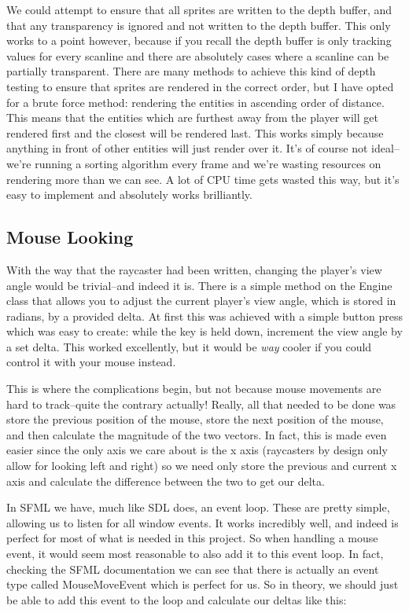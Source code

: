 \documentclass{article}
\begin{document}
We could attempt to ensure that all sprites are written to the depth buffer, and
that any transparency is ignored and not written to the depth buffer. This only
works to a point however, because if you recall the depth buffer is only
tracking values for every scanline and there are absolutely cases where a
scanline can be partially transparent. There are many methods to achieve this
kind of depth testing to ensure that sprites are rendered in the correct order,
but I have opted for a brute force method: rendering the entities in ascending
order of distance. This means that the entities which are furthest away from the
player will get rendered first and the closest will be rendered last. This works
simply because anything in front of other entities will just render over it.
It's of course not ideal--we're running a sorting algorithm every frame and
we're wasting resources on rendering more than we can see. A lot of CPU time
gets wasted this way, but it's easy to implement and absolutely works
brilliantly.

\subsection{Mouse Looking}
With the way that the raycaster had been written, changing the player's view
angle would be trivial--and indeed it is. There is a simple method on the Engine
class that allows you to adjust the current player's view angle, which is stored
in radians, by a provided delta. At first this was achieved with a simple button
press which was easy to create: while the key is held down, increment the view
angle by a set delta. This worked excellently, but it would be \textit{way}
cooler if you could control it with your mouse instead.

This is where the complications begin, but not because mouse movements are hard
to track--quite the contrary actually! Really, all that needed to be done was
store the previous position of the mouse, store the next position of the mouse,
and then calculate the magnitude of the two vectors. In fact, this is made even
easier since the only axis we care about is the x axis (raycasters by design
only allow for looking left and right) so we need only store the previous and
current x axis and calculate the difference between the two to get our delta.

In SFML we have, much like SDL does, an event loop. These are pretty simple,
allowing us to listen for all window events. It works incredibly well, and
indeed is perfect for most of what is needed in this project. So when handling a
mouse event, it would seem most reasonable to also add it to this event loop. In
fact, checking the SFML documentation we can see that there is actually an event
type called MouseMoveEvent which is perfect for us. So in theory, we should just
be able to add this event to the loop and calculate our deltas like this:
\end{document}
